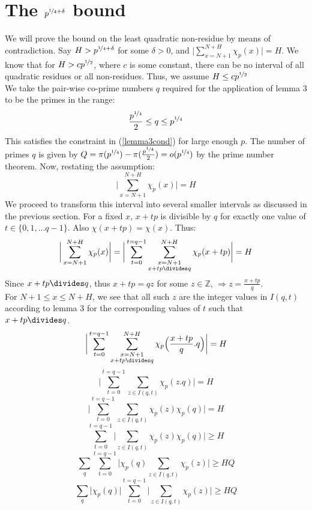 \documentclass{report}
\begin{document}
\section{The $p^{\nicefrac{1}{4}+\delta}$ bound}
We will prove the bound on the least quadratic non-residue by means of contradiction. Say $H>p^{\nicefrac{1}{4}+\delta}$ for some $\delta>0$, and $\Big \lvert \sum\limits_{x=N+1}^{N+H}\chi_p(x)\Big \rvert=H$. We know that for $H>cp^{\nicefrac{1}{2}}$, where $c$ is some constant, there can be no interval of all quadratic residues or all non-residues. Thus, we assume $H\leq cp^{\nicefrac{1}{2}}$\\
We take the pair-wise co-prime numbers $q$ required for the application of lemma 3 to be the primes in the range:
$$\frac{p^{\nicefrac{1}{4}}}{2} \leq q \leq p^{\nicefrac{1}{4}}$$
This satisfies the constraint in (\ref{lemma3cond}) for large enough $p$. The number of primes $q$ is given by $Q=\pi(p^{\nicefrac{1}{4}})-\pi(\frac{p^{\nicefrac{1}{4}}}{2})=o(p^{\nicefrac{1}{4}})$ by the prime number theorem. Now, restating the assumption:
$$\bigg \lvert\sum\limits_{x=N+1}^{N+H}\chi_p(x)\bigg \rvert=H$$
We proceed to transform this interval into several smaller intervals as discussed in the previous section. For a fixed $x$, $x+tp$ is divisible by $q$ for exactly one value of $t\in\{0,1,...q-1\}$. Also $\chi(x+tp)=\chi(x)$. Thus:
$$\bigg \lvert\sum\limits_{x=N+1}^{N+H}\chi_p(x)\bigg \rvert=\bigg \lvert\sum\limits_{t=0}^{t=q-1}\sum\limits_{\substack{x=N+1\\x+tp\divides q}}^{N+H}\chi_p(x+tp)\bigg \rvert=H$$
Since $x+tp\divides q$, thus $x+tp=qz$ for some $z\in\mathbb{Z}$, $\Rightarrow z=\frac{x+tp}{q}$.\\
For $N+1\leq x \leq N+H$, we see that all such $z$ are the integer values in $I(q,t)$ according to lemma 3 for the corresponding values of $t$ such that $x+tp\divides q$.
$$\bigg \lvert\sum\limits_{t=0}^{t=q-1}\sum\limits_{\substack{x=N+1\\x+tp\divides q}}^{N+H} \chi_p \Big(\frac{x+tp}{q}.q\Big)\bigg \rvert=H$$
$$\bigg \lvert\sum\limits_{t=0}^{t=q-1}\sum\limits_{z\in I(q,t)}\chi_p(z.q)\bigg \rvert=H$$
$$\bigg \lvert\sum\limits_{t=0}^{t=q-1}\sum\limits_{z\in I(q,t)}\chi_p(z)\chi_p(q)\bigg \rvert=H$$
$$\sum\limits_{t=0}^{t=q-1}\bigg \lvert\sum\limits_{z\in I(q,t)}\chi_p(z)\chi_p(q)\bigg \rvert \geq H$$
$$\sum_q\sum\limits_{t=0}^{t=q-1}\bigg \lvert\chi_p(q)\sum\limits_{z\in I(q,t)}\chi_p(z)\bigg \rvert \geq HQ$$
$$\sum_q\bigg \lvert\chi_p(q)\bigg\rvert\sum\limits_{t=0}^{t=q-1}\bigg\lvert\sum\limits_{z\in I(q,t)}\chi_p(z)\bigg \rvert \geq HQ$$
\end{document}
